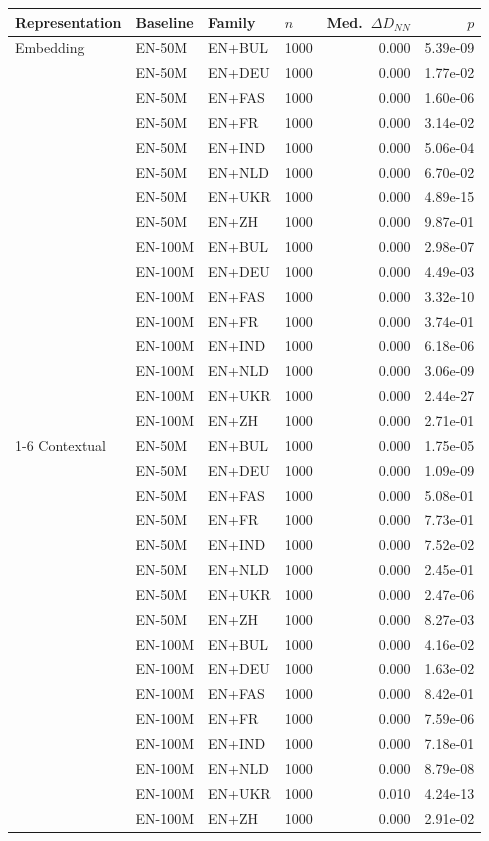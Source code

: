 \begin{tabular}{@{}llllrr@{}}
\toprule
Representation & Baseline & Family & $n$ & Med.\ $\Delta D_{NN}$ & $p$ \\
\midrule
Embedding & EN-50M & EN+BUL & 1000 & 0.000 & 5.39e-09 \\
 & EN-50M & EN+DEU & 1000 & 0.000 & 1.77e-02 \\
 & EN-50M & EN+FAS & 1000 & 0.000 & 1.60e-06 \\
 & EN-50M & EN+FR & 1000 & 0.000 & 3.14e-02 \\
 & EN-50M & EN+IND & 1000 & 0.000 & 5.06e-04 \\
 & EN-50M & EN+NLD & 1000 & 0.000 & 6.70e-02 \\
 & EN-50M & EN+UKR & 1000 & 0.000 & 4.89e-15 \\
 & EN-50M & EN+ZH & 1000 & 0.000 & 9.87e-01 \\
 & EN-100M & EN+BUL & 1000 & 0.000 & 2.98e-07 \\
 & EN-100M & EN+DEU & 1000 & 0.000 & 4.49e-03 \\
 & EN-100M & EN+FAS & 1000 & 0.000 & 3.32e-10 \\
 & EN-100M & EN+FR & 1000 & 0.000 & 3.74e-01 \\
 & EN-100M & EN+IND & 1000 & 0.000 & 6.18e-06 \\
 & EN-100M & EN+NLD & 1000 & 0.000 & 3.06e-09 \\
 & EN-100M & EN+UKR & 1000 & 0.000 & 2.44e-27 \\
 & EN-100M & EN+ZH & 1000 & 0.000 & 2.71e-01 \\
\cmidrule(lr){1-6}
Contextual & EN-50M & EN+BUL & 1000 & 0.000 & 1.75e-05 \\
 & EN-50M & EN+DEU & 1000 & 0.000 & 1.09e-09 \\
 & EN-50M & EN+FAS & 1000 & 0.000 & 5.08e-01 \\
 & EN-50M & EN+FR & 1000 & 0.000 & 7.73e-01 \\
 & EN-50M & EN+IND & 1000 & 0.000 & 7.52e-02 \\
 & EN-50M & EN+NLD & 1000 & 0.000 & 2.45e-01 \\
 & EN-50M & EN+UKR & 1000 & 0.000 & 2.47e-06 \\
 & EN-50M & EN+ZH & 1000 & 0.000 & 8.27e-03 \\
 & EN-100M & EN+BUL & 1000 & 0.000 & 4.16e-02 \\
 & EN-100M & EN+DEU & 1000 & 0.000 & 1.63e-02 \\
 & EN-100M & EN+FAS & 1000 & 0.000 & 8.42e-01 \\
 & EN-100M & EN+FR & 1000 & 0.000 & 7.59e-06 \\
 & EN-100M & EN+IND & 1000 & 0.000 & 7.18e-01 \\
 & EN-100M & EN+NLD & 1000 & 0.000 & 8.79e-08 \\
 & EN-100M & EN+UKR & 1000 & 0.010 & 4.24e-13 \\
 & EN-100M & EN+ZH & 1000 & 0.000 & 2.91e-02 \\
\bottomrule
\end{tabular}
